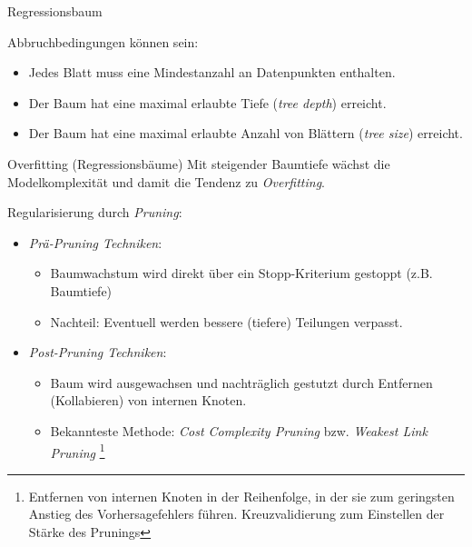 \begin{defi}{Regressionsbaum}
\begin{enumerate}
              Abbruchbedingungen können sein:
              \begin{itemize}
                  \item Jedes Blatt muss eine Mindestanzahl an Datenpunkten enthalten.
                  \item Der Baum hat eine maximal erlaubte Tiefe (\emph{tree depth}) erreicht.
                  \item Der Baum hat eine maximal erlaubte Anzahl von Blättern (\emph{tree size}) erreicht.
              \end{itemize}
    \end{enumerate}
\end{defi}

\begin{defi}{Overfitting (Regressionsbäume)}
    Mit steigender Baumtiefe wächst die Modelkomplexität und damit die Tendenz zu \emph{Overfitting}.

    Regularisierung durch \emph{Pruning}:
    \begin{itemize}
        \item \emph{Prä-Pruning Techniken}:
              \begin{itemize}
                  \item Baumwachstum wird direkt über ein Stopp-Kriterium gestoppt (z.B. Baumtiefe)
                  \item Nachteil: Eventuell werden bessere (tiefere) Teilungen verpasst.
              \end{itemize}
        \item \emph{Post-Pruning Techniken}:
              \begin{itemize}
                  \item Baum wird ausgewachsen und nachträglich gestutzt durch Entfernen (Kollabieren) von internen Knoten.
                  \item Bekannteste Methode: \emph{Cost Complexity Pruning} bzw. \emph{Weakest Link Pruning}
                        \footnote{
                            Entfernen von internen Knoten in der Reihenfolge, in der sie zum geringsten Anstieg des Vorhersagefehlers führen. Kreuzvalidierung zum Einstellen der Stärke des Prunings
                        }
              \end{itemize}
    \end{itemize}
\end{defi}

